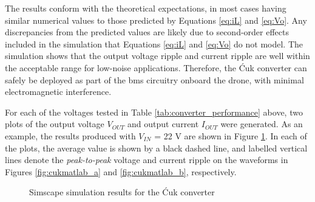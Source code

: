  The results conform with the theoretical expectations, in most cases having similar numerical values to those predicted by Equations \ref{eq:iL} and \ref{eq:Vo}. Any discrepancies from the predicted values are likely due to second-order effects included in the simulation that Equations \ref{eq:iL} and \ref{eq:Vo} do not model. The simulation shows that the output voltage ripple and current ripple are well within the acceptable range for low-noise applications. Therefore, the Ćuk converter can safely be deployed as part of the \acrshort{bms} circuitry onboard the drone, with minimal electromagnetic interference.


For each of the voltages tested in Table \ref{tab:converter_performance} above, two plots of the output voltage $V_{OUT}$ and output current $I_{OUT}$ were generated. As an example, the results produced with $V_{IN}$ = 22 V are shown in Figure \ref{fig:cukmatlab}. In each of the plots, the average value is shown by a black dashed line, and labelled vertical lines denote the \textit{peak-to-peak} voltage and current ripple on the waveforms in Figures \ref{fig:cukmatlab_a} and \ref{fig:cukmatlab_b}, respectively. 

\begin{figure}[H]
\centering
{}

\vspace{0.1cm} %

\caption{Simscape simulation results for the Ćuk converter}
\label{fig:cukmatlab}
\end{figure}

